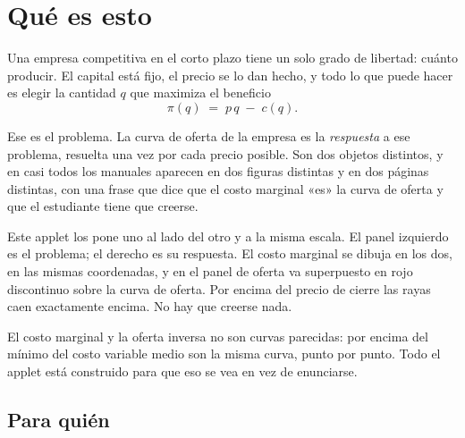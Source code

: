 \documentclass[11pt,a4paper]{appletmanual}
\begin{document}

\manualtoc
\thispagestyle{empty}
\clearpage
\setcounter{page}{1}

\section{Qué es esto}

Una empresa competitiva en el corto plazo tiene un solo grado de libertad:
cuánto producir. El capital está fijo, el precio se lo dan hecho, y todo lo que
puede hacer es elegir la cantidad $q$ que maximiza el beneficio
\[
  \pi(q) \;=\; p\,q \;-\; c(q).
\]

Ese es el problema. La curva de oferta de la empresa es la \emph{respuesta} a
ese problema, resuelta una vez por cada precio posible. Son dos objetos
distintos, y en casi todos los manuales aparecen en dos figuras distintas y en
dos páginas distintas, con una frase que dice que el costo marginal «es» la
curva de oferta y que el estudiante tiene que creerse.

Este applet los pone uno al lado del otro y a la misma escala. El panel
izquierdo es el problema; el derecho es su respuesta. El costo marginal se dibuja en
los dos, en las mismas coordenadas, y en el panel de oferta va superpuesto en
rojo discontinuo sobre la curva de oferta. Por encima del precio de cierre las
rayas caen exactamente encima. No hay que creerse nada.


\begin{amkey}
El costo marginal y la oferta inversa no son curvas parecidas: por encima del
mínimo del costo variable medio son la misma curva, punto por punto. Todo el
applet está construido para que eso se vea en vez de enunciarse.
\end{amkey}

\subsection{Para quién}
\end{document}
